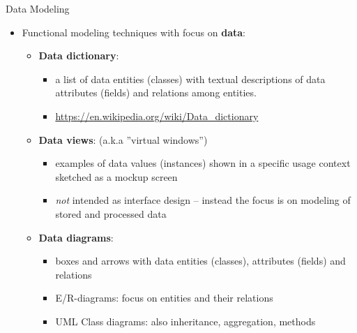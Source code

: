\begin{Slide}{Data Modeling }
\begin{itemize}
\item Functional modeling techniques with focus on \textbf{data}:
\begin{itemize}
\item \textbf{Data dictionary}:  
\begin{itemize}
\item a list of data entities (classes) with textual descriptions of data attributes (fields) and relations among entities.
\item \url{https://en.wikipedia.org/wiki/Data_dictionary}
\end{itemize}
\item \textbf{Data views}: (a.k.a ''virtual windows'')
\begin{itemize}
\item examples of data values (instances) shown in a specific usage context sketched as a mockup screen
\item \textit{not} intended as interface design -- instead the focus is on modeling of stored and processed data 
\end{itemize}
\item \textbf{Data diagrams}: 
\begin{itemize}
\item boxes and arrows with data entities (classes), attributes (fields) and relations
\item E/R-diagrams: focus on entities and their relations 
\item UML Class diagrams: also inheritance, aggregation, methods

\end{itemize}
\end{itemize}
\end{itemize}
\end{Slide}